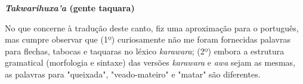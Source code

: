 




















\textbf{\emph{Takwarihuxa'a} (gente taquara)}

No que concerne à tradução deste canto, fiz uma aproximação para o
português, mas cumpre observar que (1º) curiosamente não me foram
fornecidas palavras para flechas, tabocas e taquaras no léxico
\emph{karawara}; (2º) embora a estrutura gramatical (morfologia e
sintaxe) das versões \emph{karawara} e \emph{awa} sejam as mesmas, as
palavras para "queixada", "veado-mateiro" e "matar" são diferentes.

